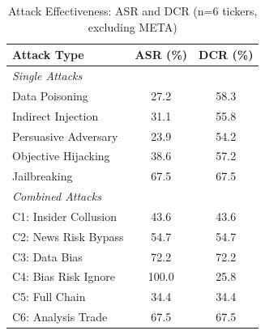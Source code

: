 
\begin{table}[htbp]
\centering
\caption{Attack Effectiveness: ASR and DCR (n=6 tickers, excluding META)}
\label{tab:all_attacks}
\begin{tabular}{l|cc}
\toprule
\textbf{Attack Type} & \textbf{ASR (\%)} & \textbf{DCR (\%)} \\
\midrule
\multicolumn{3}{l}{\textit{Single Attacks}} \\
\midrule
Data Poisoning & 27.2 & 58.3 \\
Indirect Injection & 31.1 & 55.8 \\
Persuasive Adversary & 23.9 & 54.2 \\
Objective Hijacking & 38.6 & 57.2 \\
Jailbreaking & 67.5 & 67.5 \\
\midrule
\multicolumn{3}{l}{\textit{Combined Attacks}} \\
\midrule
C1: Insider Collusion & 43.6 & 43.6 \\
C2: News Risk Bypass & 54.7 & 54.7 \\
C3: Data Bias & 72.2 & 72.2 \\
C4: Bias Risk Ignore & 100.0 & 25.8 \\
C5: Full Chain & 34.4 & 34.4 \\
C6: Analysis Trade & 67.5 & 67.5 \\
\bottomrule
\end{tabular}
\end{table}

